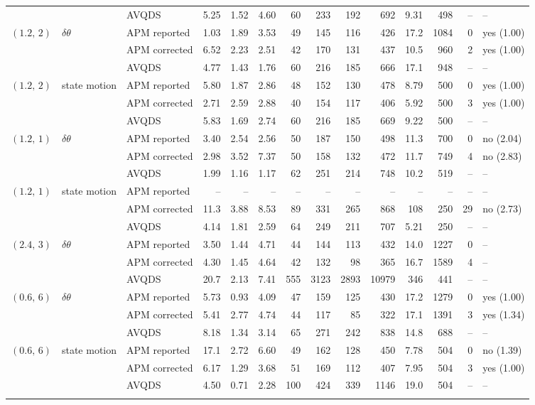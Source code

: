 \documentclass[10pt]{article}
\begin{document}
\begin{table}[H]
\begin{tabular}{lllrrrrrrrrrrl}
 &  & AVQDS & 5.25 & 1.52 & 4.60 & 60 & 233 & 192 & 692 & 9.31 & 498 & -- & -- \\
\addlinespace[2pt]
$(1.2,\,2)$ & $\delta\theta$ & APM reported & 1.03 & 1.89 & 3.53 & 49 & 145 & 116 & 426 & 17.2 & 1084 & 0 & yes (1.00) \\
 &  & APM corrected & 6.52 & 2.23 & 2.51 & 42 & 170 & 131 & 437 & 10.5 & 960 & 2 & yes (1.00) \\
 &  & AVQDS & 4.77 & 1.43 & 1.76 & 60 & 216 & 185 & 666 & 17.1 & 948 & -- & -- \\
\addlinespace[2pt]
$(1.2,\,2)$ & state motion & APM reported & 5.80 & 1.87 & 2.86 & 48 & 152 & 130 & 478 & 8.79 & 500 & 0 & yes (1.00) \\
 &  & APM corrected & 2.71 & 2.59 & 2.88 & 40 & 154 & 117 & 406 & 5.92 & 500 & 3 & yes (1.00) \\
 &  & AVQDS & 5.83 & 1.69 & 2.74 & 60 & 216 & 185 & 669 & 9.22 & 500 & -- & -- \\
\addlinespace[2pt]
$(1.2,\,1)$ & $\delta\theta$ & APM reported & 3.40 & 2.54 & 2.56 & 50 & 187 & 150 & 498 & 11.3 & 700 & 0 & no (2.04) \\
 &  & APM corrected & 2.98 & 3.52 & 7.37 & 50 & 158 & 132 & 472 & 11.7 & 749 & 4 & no (2.83) \\
 &  & AVQDS & 1.99 & 1.16 & 1.17 & 62 & 251 & 214 & 748 & 10.2 & 519 & -- & -- \\
\addlinespace[2pt]
$(1.2,\,1)$ & state motion & APM reported & -- & -- & -- & -- & -- & -- & -- & -- & -- & -- & -- \\
 &  & APM corrected & 11.3 & 3.88 & 8.53 & 89 & 331 & 265 & 868 & 108 & 250 & 29 & no (2.73) \\
 &  & AVQDS & 4.14 & 1.81 & 2.59 & 64 & 249 & 211 & 707 & 5.21 & 250 & -- & -- \\
\addlinespace[2pt]
$(2.4,\,3)$ & $\delta\theta$ & APM reported & 3.50 & 1.44 & 4.71 & 44 & 144 & 113 & 432 & 14.0 & 1227 & 0 & -- \\
 &  & APM corrected & 4.30 & 1.45 & 4.64 & 42 & 132 & 98 & 365 & 16.7 & 1589 & 4 & -- \\
 &  & AVQDS & 20.7 & 2.13 & 7.41 & 555 & 3123 & 2893 & 10979 & 346 & 441 & -- & -- \\
\addlinespace[2pt]
$(0.6,\,6)$ & $\delta\theta$ & APM reported & 5.73 & 0.93 & 4.09 & 47 & 159 & 125 & 430 & 17.2 & 1279 & 0 & yes (1.00) \\
 &  & APM corrected & 5.41 & 2.77 & 4.74 & 44 & 117 & 85 & 322 & 17.1 & 1391 & 3 & yes (1.34) \\
 &  & AVQDS & 8.18 & 1.34 & 3.14 & 65 & 271 & 242 & 838 & 14.8 & 688 & -- & -- \\
\addlinespace[2pt]
$(0.6,\,6)$ & state motion & APM reported & 17.1 & 2.72 & 6.60 & 49 & 162 & 128 & 450 & 7.78 & 504 & 0 & no (1.39) \\
 &  & APM corrected & 6.17 & 1.29 & 3.68 & 51 & 169 & 112 & 407 & 7.95 & 504 & 3 & yes (1.00) \\
 &  & AVQDS & 4.50 & 0.71 & 2.28 & 100 & 424 & 339 & 1146 & 19.0 & 504 & -- & -- \\
\addlinespace[2pt]
\bottomrule\end{tabular}\end{table}
\end{document}
